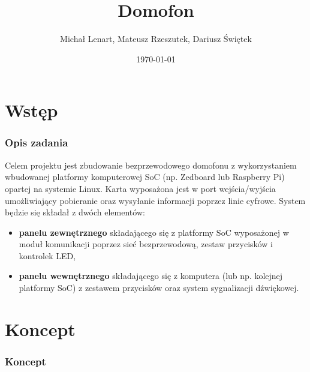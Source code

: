 \documentclass[presentation, 10pt]{beamer}
\institute[IS]{Informatyka Stosowana}
\author[M. Lenart, M. Rzeszutek, D. Świętek]{Michał Lenart, Mateusz Rzeszutek, Dariusz Świętek}
\title{Domofon}
\date{\today}
\begin{document}
\maketitle






\section{Wstęp}
\label{sec-1}
\begin{frame}
\frametitle{Opis zadania}
\label{sec-1-1}

Celem projektu jest zbudowanie bezprzewodowego domofonu z wykorzystaniem wbudowanej platformy komputerowej SoC (np. Zedboard lub Raspberry Pi) opartej na systemie Linux. 
Karta wyposażona jest w port wejścia/wyjścia umożliwiający pobieranie oraz wysyłanie informacji poprzez linie cyfrowe.
System będzie się składał z dwóch elementów:
\begin{itemize}
\item \textbf{panelu zewnętrznego} składającego się z platformy SoC wyposażonej w moduł komunikacji poprzez sieć bezprzewodową, zestaw przycisków i kontrolek LED,
\item \textbf{panelu wewnętrznego} składającego się z komputera (lub np. kolejnej platformy SoC) z zestawem przycisków oraz system sygnalizacji dźwiękowej.
\end{itemize}
\end{frame}
\section{Koncept}
\label{sec-2}
\begin{frame}
\frametitle{Koncept}
\label{sec-2-1}

\end{frame}
\end{document}
